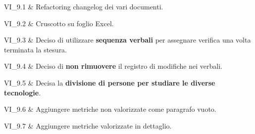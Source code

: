 VI\_9.1 & Refactoring changelog dei vari documenti.

\tabularnewline
VI\_9.2 & Cruscotto su foglio Excel.

\tabularnewline

VI\_9.3 & Deciso di utilizzare \textbf{sequenza verbali} per assegnare verifica una volta terminata la stesura.

\tabularnewline

VI\_9.4 & Deciso di \textbf{non rimuovere} il registro di modifiche nei verbali.

\tabularnewline

VI\_9.5 & Decisa la \textbf{divisione di persone per studiare le diverse tecnologie}.

\tabularnewline

VI\_9.6 & Aggiungere metriche non valorizzate come paragrafo vuoto.

\tabularnewline

VI\_9.7 & Aggiungere metriche valorizzate in dettaglio.

\tabularnewline